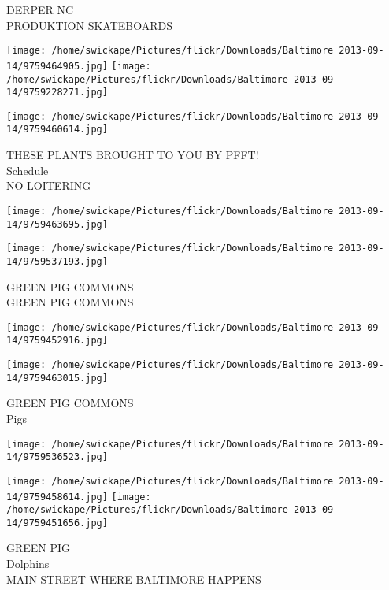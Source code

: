 \documentclass[10pt,letterpaper]{article}
\begin{document}
DERPER NC\\
PRODUKTION SKATEBOARDS\\
\pagebreak

\texttt{[image: /home/swickape/Pictures/flickr/Downloads/Baltimore 2013-09-14/9759464905.jpg]}
\texttt{[image: /home/swickape/Pictures/flickr/Downloads/Baltimore 2013-09-14/9759228271.jpg]}

\vspace{0.25in}
\texttt{[image: /home/swickape/Pictures/flickr/Downloads/Baltimore 2013-09-14/9759460614.jpg]}

THESE PLANTS BROUGHT TO YOU BY PFFT!\\
Schedule\\
NO LOITERING\\
\pagebreak

\texttt{[image: /home/swickape/Pictures/flickr/Downloads/Baltimore 2013-09-14/9759463695.jpg]}

\vspace{0.25in}
\texttt{[image: /home/swickape/Pictures/flickr/Downloads/Baltimore 2013-09-14/9759537193.jpg]}

GREEN PIG COMMONS\\
GREEN PIG COMMONS\\
\pagebreak

\texttt{[image: /home/swickape/Pictures/flickr/Downloads/Baltimore 2013-09-14/9759452916.jpg]}

\vspace{0.25in}
\texttt{[image: /home/swickape/Pictures/flickr/Downloads/Baltimore 2013-09-14/9759463015.jpg]}

GREEN PIG COMMONS\\
Pigs\\
\pagebreak

\texttt{[image: /home/swickape/Pictures/flickr/Downloads/Baltimore 2013-09-14/9759536523.jpg]}

\vspace{0.25in}
\texttt{[image: /home/swickape/Pictures/flickr/Downloads/Baltimore 2013-09-14/9759458614.jpg]}
\texttt{[image: /home/swickape/Pictures/flickr/Downloads/Baltimore 2013-09-14/9759451656.jpg]}

GREEN PIG\\
Dolphins\\
MAIN STREET WHERE BALTIMORE HAPPENS\\
\pagebreak
\end{document}
